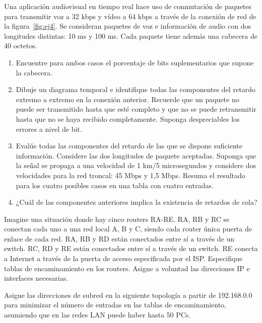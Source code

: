 \begin{ejercicio}
    Una aplicación audiovisual en tiempo real hace uso de conmutación de paquetes para transmitir voz a 32 kbps y vídeo a 64 kbps a través de la conexión de red de la figura~\ref{fig:ej4}.  Se consideran paquetes de voz e información de audio con dos longitudes distintas: 10 ms y 100 ms. Cada paquete tiene además una cabecera de 40 octetos.
    \begin{enumerate}[label=\alph*.]
        \item Encuentre para ambos casos el porcentaje de bits suplementarios que supone la cabecera.
        \item Dibuje un diagrama temporal e identifique todas las componentes del retardo extremo a extremo en la conexión anterior. Recuerde que un paquete no puede ser transmitido hasta que esté completo y que no se puede retransmitir hasta que no se haya recibido completamente. Suponga despreciables los errores a nivel de bit.
        \item Evalúe todas las componentes del retardo de las que se dispone suficiente información. Considere las dos longitudes de paquete aceptadas. Suponga que la señal se propaga a una velocidad de 1 km/5 microsegundos y considere dos velocidades para la red troncal: 45 Mbps y 1,5 Mbps. Resuma el resultado para los cuatro posibles casos en una tabla con cuatro entradas.
        \item ¿Cuál de las componentes anteriores implica la existencia de retardos de cola?
    \end{enumerate}

\end{ejercicio}

\begin{ejercicio}
    Imagine una situación donde hay cinco routers RA‐RE\@. RA, RB y RC se conectan cada uno a una red local A, B y C, siendo cada router única puerta de enlace de cada red. RA, RB y RD están conectados entre sí a través de un switch. RC, RD y RE están conectados entre sí a través de un switch. RE conecta a Internet a través de la puerta de acceso especificada por el ISP\@. Especifique tablas de encaminamiento en los routers. Asigne a voluntad las direcciones IP e interfaces necesarias.
\end{ejercicio}

\begin{ejercicio}
    Asigne las direcciones de subred en la siguiente topología a partir de 192.168.0.0 para minimizar el número de entradas en las tablas de encaminamiento, asumiendo que en las redes LAN puede haber hasta 50 PCs.
\end{ejercicio}

